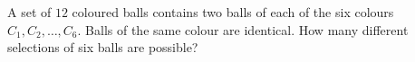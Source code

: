 A set of $12$ coloured balls contains two balls of each of the six colours $C_1,C_2,\dots,C_6$. Balls of the same colour are identical. How many different selections of six balls are possible?
